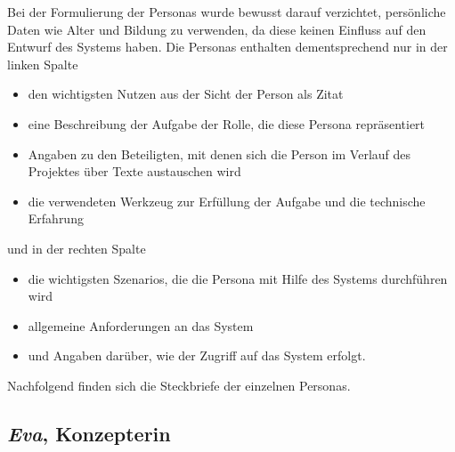 Bei der Formulierung der Personas wurde bewusst darauf verzichtet, persönliche Daten wie Alter und Bildung zu verwenden, da diese keinen Einfluss auf den Entwurf des Systems haben. Die Personas enthalten dementsprechend nur in der linken Spalte
\begin{itemize}\itemsep -5pt
\item den wichtigsten Nutzen aus der Sicht der Person als Zitat
\item eine Beschreibung der Aufgabe der Rolle, die diese Persona repräsentiert
\item Angaben zu den Beteiligten, mit denen sich die Person im Verlauf des Projektes über Texte austauschen wird
\item die verwendeten Werkzeug zur Erfüllung der Aufgabe und die technische Erfahrung
\end{itemize}
und in der rechten Spalte
\begin{itemize}\itemsep -5pt
\item die wichtigsten Szenarios, die die Persona mit Hilfe des Systems durchführen wird
\item allgemeine Anforderungen an das System
\item und Angaben darüber, wie der Zugriff auf das System erfolgt.
\end{itemize}

Nachfolgend finden sich die Steckbriefe der einzelnen Personas. 

\pagebreak

\subsection{\emph{Eva}, Konzepterin}\label{p:eva}

